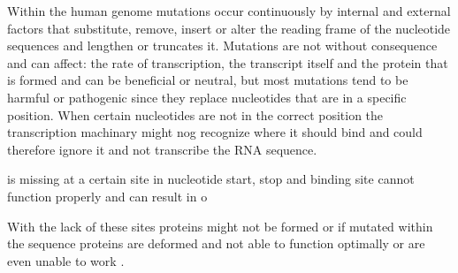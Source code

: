 Within the human genome mutations occur continuously by internal and external factors that substitute, remove, insert or alter the reading frame of the nucleotide sequences and lengthen or truncates it.  Mutations are not without consequence and can affect: the rate of transcription, the transcript itself and the protein that is formed and can be beneficial or neutral, but most mutations tend to be harmful or pathogenic since they replace nucleotides that are in a specific position. When certain nucleotides are not in the correct position the transcription machinary might nog recognize where it should bind and could therefore ignore it and not transcribe the RNA sequence.


is missing at a certain site in nucleotide start, stop and binding site cannot function properly and can result in o

With the lack of these sites proteins might not be formed or if mutated within the sequence  proteins are deformed and not able to function optimally or are even unable to work \cite{}.



%
%

